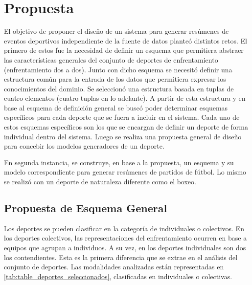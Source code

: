 \chapter{Propuesta}\label{chapter:proposal}
 
    El objetivo de proponer el diseño de un sistema para generar resúmenes de eventos deportivos independiente de la fuente de datos 
planteó distintos retos. El primero de estos fue la necesidad de definir un esquema que permitiera abstraer las características 
generales del conjunto de deportes de enfrentamiento (enfrentamiento dos a dos). Junto con dicho esquema se necesitó 
definir una estructura común para la entrada de los datos que permitiera expresar los conocimientos del dominio. Se seleccionó 
una estructura basada en tuplas de cuatro elementos (cuatro-tuplas en lo adelante). A partir de esta estructura y en base 
al esquema de definición general se buscó poder determinar esquemas específicos para cada deporte que se fuera a incluir en el 
sistema. Cada uno de estos esquemas específicos son los que se encargan de definir un deporte de forma individual dentro del sistema.
Luego se realiza una propuesta general de diseño para concebir los modelos generadores de un deporte.
    
    En segunda instancia, se construye, en base a la propuesta, un esquema y su modelo correspondiente para generar 
resúmenes de partidos de fútbol. Lo mismo se realizó con un deporte de naturaleza diferente como el boxeo.

\section{Propuesta de Esquema General}

    Los deportes se pueden clasificar en la categoría de individuales o colectivos. En los deportes colectivos, las representaciones 
del enfrentamiento ocurren en base a equipos que agrupan a individuos. A su vez, en los deportes individuales son dos los contendientes.
Esta es la primera diferencia que se extrae en el análisis del conjunto de deportes. Las modalidades analizadas están representadas en \ref{tab:table_deportes_seleccionados}, 
clasificadas en individuales o colectivas.

